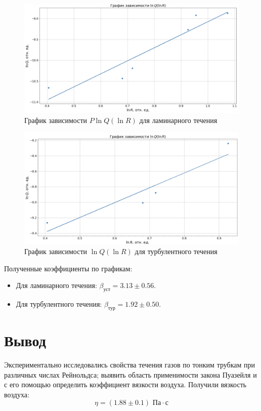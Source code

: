 \documentclass[a4paper,12pt]{article}
\theoremstyle{definition}
\begin{document}
	\begin{figure}[H]
		\centering
		\includegraphics[scale = 0.5]{qr norm}
		\caption{График зависимости $P\ln Q(\ln R)$ для ламинарного течения}
		\label{graph5}
	\end{figure}

	\begin{figure}[H]
		\centering
		\includegraphics[scale = 0.5]{qr unnorm}
		\caption{График зависимости $\ln Q(\ln R)$ для турбулентного течения}
		\label{graph6}
	\end{figure}

	Полученные коэффициенты по графикам: 
	\begin{itemize}
		\item Для ламинарного течения: $\beta_\text{уст} = 3.13\pm0.56$.
		\item Для турбулентного течения: $\beta_\text{тур} = 1.92\pm 0.50$.
	\end{itemize}

	\section{Вывод}
	
	Экспериментально исследовались свойства течения газов по тонким трубкам при различных числах Рейнольдса; выявить область применимости закона Пуазейля и с его помощью
	определить коэффициент вязкости воздуха. Получили вязкость воздуха:
	\begin{equation*}
		\eta = (1.88\pm 0.1)\text{ Па}\cdot\text{с}
	\end{equation*}
	
\end{document}
